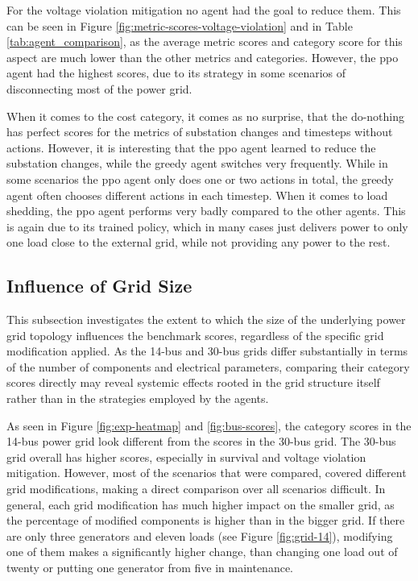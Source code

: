For the voltage violation mitigation no agent had the goal to reduce them. This can be seen in Figure \ref{fig:metric-scores-voltage-violation} and in Table \ref{tab:agent_comparison}, as the average metric scores and category score for this aspect are much lower than the other metrics and categories. However, the \ac{ppo} agent had the highest scores, due to its strategy in some scenarios of disconnecting most of the power grid. 

When it comes to the cost category, it comes as no surprise, that the do-nothing has perfect scores for the metrics of substation changes and timesteps without actions. However, it is interesting that the \ac{ppo} agent learned to reduce the substation changes, while the greedy agent switches very frequently. While in some scenarios the \ac{ppo} agent only does one or two actions in total, the greedy agent often chooses different actions in each timestep. When it comes to load shedding, the \ac{ppo} agent performs very badly compared to the other agents. This is again due to its trained policy, which in many cases just delivers power to only one load close to the external grid, while not providing any power to the rest. 

\subsection{Influence of Grid Size}\label{ssec:influence-grid-size}
This subsection investigates the extent to which the size of the underlying power grid topology influences the benchmark scores, regardless of the specific grid modification applied. As the 14-bus and 30-bus grids differ substantially in terms of the number of components and electrical parameters, comparing their category scores directly may reveal systemic effects rooted in the grid structure itself rather than in the strategies employed by the agents.

As seen in Figure \ref{fig:exp-heatmap} and \ref{fig:bus-scores}, the category scores in the 14-bus power grid look different from the scores in the 30-bus grid. The 30-bus grid overall has higher scores, especially in survival and voltage violation mitigation. However, most of the scenarios that were compared, covered different grid modifications, making a direct comparison over all scenarios difficult. In general, each grid modification has much higher impact on the smaller grid, as the percentage of modified components is higher than in the bigger grid. If there are only three generators and eleven loads (see Figure \ref{fig:grid-14}), modifying one of them makes a significantly higher change, than changing one load out of twenty or putting one generator from five in maintenance.

